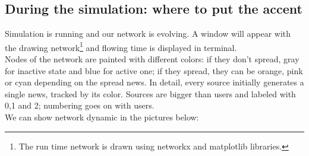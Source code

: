 \subsection{During the simulation: where to put the accent}\label{subsec:during}
Simulation is running and our network is evolving. A window will appear with the drawing network\footnote{The run time network is drawn using networkx and matplotlib libraries.} and flowing time is displayed in terminal. \\
Nodes of the network are painted with different colors: if they don't spread, gray for inactive state and blue for active one; if they spread, they can be orange, pink or cyan depending on the spread news. In detail, every source initially generates a single news, tracked by its color. Sources are bigger than users and labeled with 0,1 and 2; numbering goes on with users.\\
We can show network dynamic in the pictures below:
